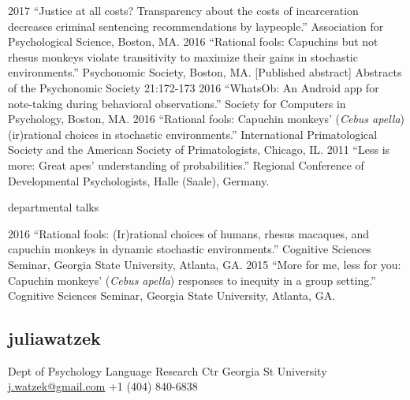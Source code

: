 \documentclass[]{friggeri-cv}
\begin{document}
\begin{entrylist2}
  \entrytwo
    {2017}
    {``Justice at all costs? Transparency about the costs of incarceration decreases criminal sentencing recommendations by laypeople.'' Association for Psychological Science, Boston, MA.}
  \entrytwo
    {2016}
    {``Rational fools: Capuchins but not rhesus monkeys violate transitivity to maximize their gains in stochastic environments.'' Psychonomic Society, Boston, MA. [Published abstract] Abstracts of the Psychonomic Society 21:172-173}
  \entrytwo
    {2016}
    {``WhatsOb: An Android app for note-taking during behavioral observations.'' Society for Computers in Psychology, Boston, MA.}
  \entrytwo
    {2016}
    {``Rational fools: Capuchin monkeys' (\emph{Cebus apella}) (ir)rational choices in stochastic environments.'' International Primatological Society and the American Society of Primatologists, Chicago, IL.}
  \entrytwo
    {2011}
    {``Less is more: Great apes' understanding of probabilities.'' Regional Conference of Developmental Psychologists, Halle (Saale), Germany.}
\end{entrylist2}


{\subfont\large{} departmental talks}

\begin{entrylist2}
  \entrytwo
    {2016}
    {``Rational fools: (Ir)rational choices of humans, rhesus macaques, and capuchin monkeys in dynamic stochastic environments.'' Cognitive Sciences Seminar, Georgia State University, Atlanta, GA.}
  \entrytwo
    {2015}
    {``More for me, less for you: Capuchin monkeys' (\emph{Cebus apella}) responses to inequity in a group setting.'' Cognitive Sciences Seminar, Georgia State University, Atlanta, GA.}
\end{entrylist2}


\newpage
\thispagestyle{fancy}

\begin{aside}
  \section{{\normalfont julia}watzek}
    Dept of Psychology
    Language Research Ctr
    Georgia St University
    ~
    \href{mailto:j.watzek@gmail.com}{j.watzek@gmail.com}
    +1 (404) 840-6838
\end{aside}
\end{document}
